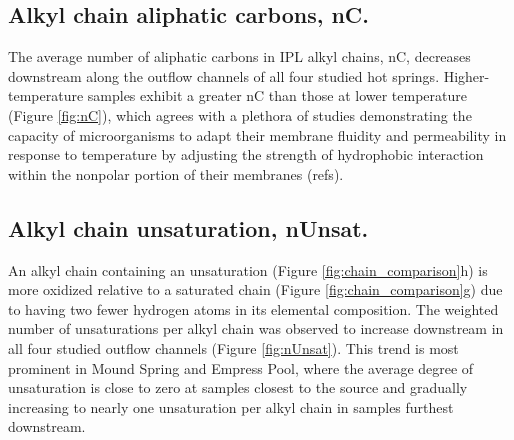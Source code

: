 \subsection{Alkyl chain aliphatic carbons, nC.} The average number of aliphatic carbons in IPL alkyl chains, nC, decreases downstream along the outflow channels of all four studied hot springs. Higher-temperature samples exhibit a greater nC than those at lower temperature (Figure \ref{fig:nC}), which agrees with a plethora of studies demonstrating the capacity of microorganisms to adapt their membrane fluidity and permeability in response to temperature by adjusting the strength of hydrophobic interaction within the nonpolar portion of their membranes (refs).




\subsection{Alkyl chain unsaturation, nUnsat.} An alkyl chain containing an unsaturation (Figure \ref{fig:chain_comparison}h) is more oxidized relative to a saturated chain (Figure \ref{fig:chain_comparison}g) due to having two fewer hydrogen atoms in its elemental composition. The weighted number of unsaturations per alkyl chain was observed to increase downstream in all four studied outflow channels (Figure \ref{fig:nUnsat}). This trend is most prominent in Mound Spring and Empress Pool, where the average degree of unsaturation is close to zero at samples closest to the source and gradually increasing to nearly one unsaturation per alkyl chain in samples furthest downstream.

